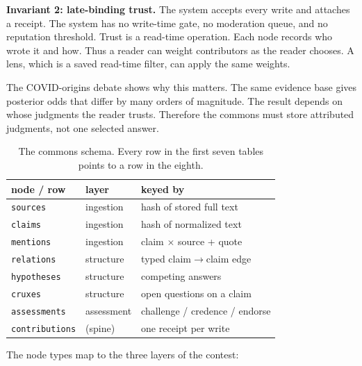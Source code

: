 \documentclass[10pt,twocolumn]{article}
\newcommand{\code}[1]{\texttt{\small #1}}
\begin{document}
\textbf{Invariant 2: late-binding trust.} The system accepts every write
and attaches a receipt. The system has no write-time gate, no moderation
queue, and no reputation threshold. Trust is a read-time operation. Each
node records who wrote it and how. Thus a reader can weight contributors
as the reader chooses. A lens, which is a saved read-time filter, can
apply the same weights.

The COVID-origins debate shows why this matters. The same evidence base
gives posterior odds that differ by many orders of magnitude. The result
depends on whose judgments the reader trusts. Therefore the commons must
store attributed judgments, not one selected answer.

\begin{table}[t]
\centering\small
\begin{tabular}{@{}lll@{}}
\toprule
node / row & layer & keyed by \\
\midrule
\code{sources} & ingestion & hash of stored full text \\
\code{claims} & ingestion & hash of normalized text \\
\code{mentions} & ingestion & claim $\times$ source + quote \\
\code{relations} & structure & typed claim$\to$claim edge \\
\code{hypotheses} & structure & competing answers \\
\code{cruxes} & structure & open questions on a claim \\
\code{assessments} & assessment & challenge / credence / endorse \\
\code{contributions} & (spine) & one receipt per write \\
\bottomrule
\end{tabular}
\caption{The commons schema. Every row in the first seven tables points to
a row in the eighth.}
\label{tab:schema}
\end{table}

The node types map to the three layers of the contest:
\end{document}
